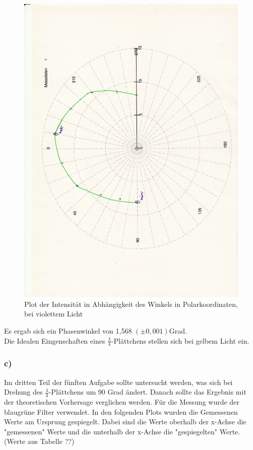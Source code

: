 \documentclass[12pt]{scrartcl}
\begin{document}
\begin{figure}[H]
\centering
    \includegraphics[scale = 0.3, angle = -90]{a_5_v.pdf}
  	\caption[Plot der Intensität in Abhängigkeit des Winkels in Polarkoordinaten, bei violettem Licht]{Plot der Intensität in Abhängigkeit des Winkels in Polarkoordinaten, bei violettem Licht}
  \label{fig:a_5_v}
\end{figure}

Es ergab sich ein Phasenwinkel von 1,568 $(\pm 0,001)$Grad.\\

Die Idealen Eingenschaften eines $\frac{\lambda}{4}$-Plättchens stellen sich bei gelbem Licht ein.

\subsubsection{c)}
Im dritten Teil der fünften Aufgabe sollte untersucht werden, was sich bei Drehung des $\frac{\lambda}{4}$-Plättchens um 90 Grad ändert. Danach sollte das Ergebnis mit der theoretischen Vorhersage verglichen werden. Für die Messung wurde der blaugrüne Filter verwendet. In den folgenden Plots wurden die Gemessenen Werte am Ursprung gespiegelt. Dabei sind die Werte oberhalb der x-Achse die "gemessenen" Werte und die unterhalb der x-Achse die "gespiegelten" Werte.(Werte aus Tabelle ??)
\end{document}
